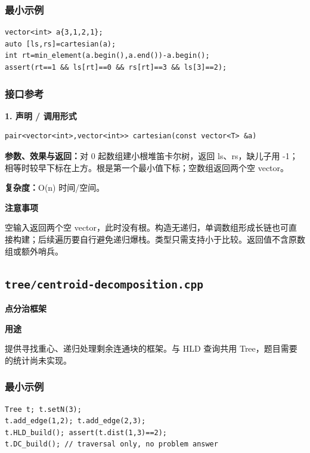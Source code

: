 \documentclass[UTF8,a4paper,10pt]{ctexart}
\newcommand{\TemplUsage}[1]{\textbf{用途}\par #1\par}
\newcommand{\TemplNote}[1]{\textbf{注意事项}\par #1\par}
\begin{document}
\subsubsection*{最小示例}
\begin{lstlisting}
vector<int> a{3,1,2,1};
auto [ls,rs]=cartesian(a);
int rt=min_element(a.begin(),a.end())-a.begin();
assert(rt==1 && ls[rt]==0 && rs[rt]==3 && ls[3]==2);
\end{lstlisting}
\subsubsection*{接口参考}
\noindent\begin{minipage}{\textwidth}
\textbf{1. 声明 / 调用形式}
\begin{lstlisting}
pair<vector<int>,vector<int>> cartesian(const vector<T> &a)
\end{lstlisting}
\textbf{参数、效果与返回：}对 0 起数组建小根堆笛卡尔树，返回 ls、rs，缺儿子用 -1；相等时较早下标在上方。根是第一个最小值下标；空数组返回两个空 vector。

\textbf{复杂度：}O(n) 时间/空间。

\TemplNote{空输入返回两个空 vector，此时没有根。构造无递归，单调数组形成长链也可直接构建；后续遍历要自行避免递归爆栈。类型只需支持小于比较。返回值不含原数组或额外哨兵。}
\end{minipage}\par\vspace{0.4em}
\clearpage
\subsection{\texttt{tree/centroid-decomposition.cpp}}
\textbf{点分治框架}\par
\TemplUsage{提供寻找重心、递归处理剩余连通块的框架。与 HLD 查询共用 Tree，题目需要的统计尚未实现。}
\subsubsection*{最小示例}
\begin{lstlisting}
Tree t; t.setN(3);
t.add_edge(1,2); t.add_edge(2,3);
t.HLD_build(); assert(t.dist(1,3)==2);
t.DC_build(); // traversal only, no problem answer
\end{lstlisting}
\end{document}
